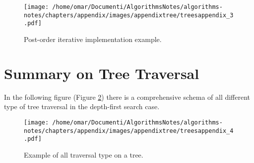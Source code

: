 \begin{figure}[H]
	\begin{center}
		\texttt{[image: /home/omar/Documenti/AlgorithmsNotes/algorithms-notes/chapters/appendix/images/appendixtree/treesappendix\_3.pdf]}
		\caption[Post-order iterative implementation example.]{Post-order iterative implementation example.}
		\label{appendixtrees_3}
	\end{center}
\end{figure}

\section{Summary on Tree Traversal}
In the following figure (Figure \ref{appendixtrees_4}) there is a comprehensive schema of all different type of tree traversal in the depth-first search case.

\begin{figure}[H]
	\begin{center}
		\texttt{[image: /home/omar/Documenti/AlgorithmsNotes/algorithms-notes/chapters/appendix/images/appendixtree/treesappendix\_4.pdf]}
		\caption[Example of all traversal type on a tree.]{Example of all traversal type on a tree.}
		\label{appendixtrees_4}
	\end{center}
\end{figure}